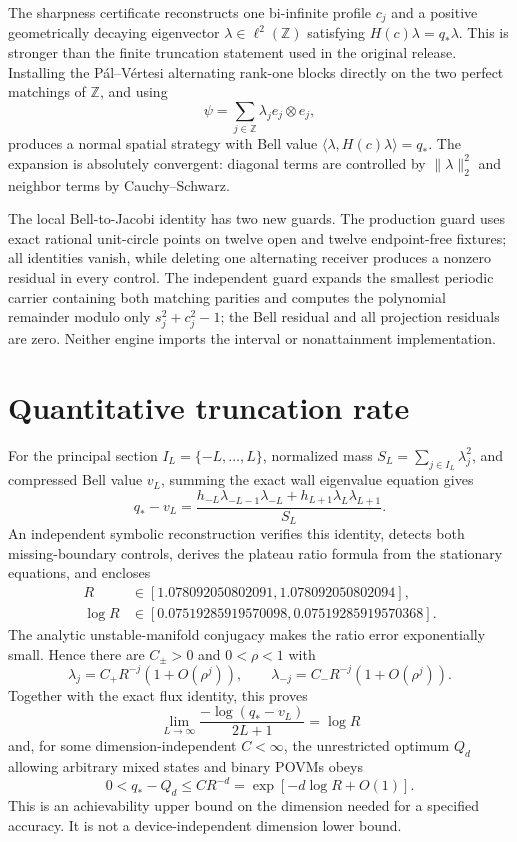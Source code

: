 \documentclass[11pt]{article}
\begin{document}
The sharpness certificate reconstructs one bi-infinite profile $c_j$ and a
positive geometrically decaying eigenvector
$\lambda\in\ell^2(\mathbb Z)$ satisfying $H(c)\lambda=q_*\lambda$.  This is
stronger than the finite truncation statement used in the original release.
Installing the P\'al--V\'ertesi alternating rank-one blocks directly on the two
perfect matchings of $\mathbb Z$, and using
\[
 \psi=\sum_{j\in\mathbb Z}\lambda_j e_j\otimes e_j,
\]
produces a normal spatial strategy with Bell value
$\langle\lambda,H(c)\lambda\rangle=q_*$.  The expansion is absolutely
convergent: diagonal terms are controlled by $\|\lambda\|_2^2$ and neighbor
terms by Cauchy--Schwarz.

The local Bell-to-Jacobi identity has two new guards.  The production guard
uses exact rational unit-circle points on twelve open and twelve endpoint-free
fixtures; all identities vanish, while deleting one alternating receiver
produces a nonzero residual in every control.  The independent guard expands
the smallest periodic carrier containing both matching parities and computes
the polynomial remainder modulo only $s_j^2+c_j^2-1$; the Bell residual and
all projection residuals are zero.  Neither engine imports the interval or
nonattainment implementation.

\section{Quantitative truncation rate}

For the principal section $I_L=\{-L,\ldots,L\}$, normalized mass
$S_L=\sum_{j\in I_L}\lambda_j^2$, and compressed Bell value $v_L$, summing
the exact wall eigenvalue equation gives
\[
q_*-v_L=
\frac{h_{-L}\lambda_{-L-1}\lambda_{-L}
      +h_{L+1}\lambda_L\lambda_{L+1}}{S_L}.
\]
An independent symbolic reconstruction verifies this identity, detects both
missing-boundary controls, derives the plateau ratio formula from the
stationary equations, and encloses
\[
\begin{aligned}
R&\in[1.078092050802091,1.078092050802094],\\
\log R&\in[0.07519285919570098,0.07519285919570368].
\end{aligned}
\]
The analytic unstable-manifold conjugacy makes the ratio error exponentially
small. Hence there are $C_\pm>0$ and $0<\rho<1$ with
\[
 \lambda_j=C_+R^{-j}(1+O(\rho^j)),\qquad
 \lambda_{-j}=C_-R^{-j}(1+O(\rho^j)).
\]
Together with the exact flux identity, this proves
\[
\lim_{L\to\infty}\frac{-\log(q_*-v_L)}{2L+1}=\log R
\]
and, for some dimension-independent $C<\infty$, the unrestricted optimum
$Q_d$ allowing arbitrary mixed states and binary POVMs obeys
\[
0<q_*-Q_d\leq C R^{-d}=\exp[-d\log R+O(1)].
\]
This is an achievability upper bound on the dimension needed for a specified
accuracy.  It is not a device-independent dimension lower bound.
\end{document}
